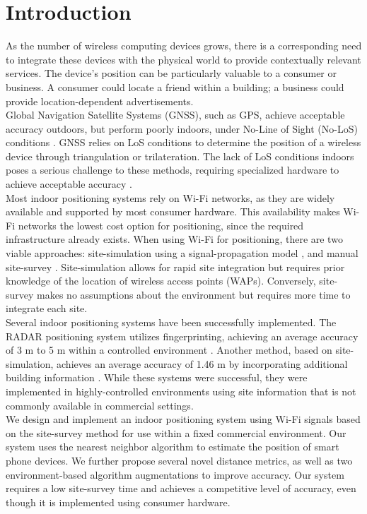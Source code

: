\documentclass[conference]{IEEEtran}
\begin{document}
\section{Introduction}
As the number of wireless computing devices grows, there is a corresponding need to integrate these devices with the physical world to provide contextually relevant services. The device's position can be particularly valuable to a consumer or business. A consumer could locate a friend within a building; a business could provide location-dependent advertisements.\\
\indent Global Navigation Satellite Systems (GNSS), such as GPS, achieve acceptable accuracy outdoors, but perform poorly indoors, under No-Line of Sight (No-LoS) conditions  \cite{Lakmali}. GNSS relies on LoS conditions to determine the position of a wireless device through triangulation or trilateration. The lack of LoS conditions indoors poses a serious challenge to these methods, requiring specialized hardware to achieve acceptable accuracy \cite{Liu}. \\
\indent Most indoor positioning systems rely on Wi-Fi networks, as they are widely available and supported by most consumer hardware. This availability makes Wi-Fi networks the lowest cost option for positioning, since the required infrastructure already exists. When using Wi-Fi for positioning, there are two viable approaches: site-simulation using a signal-propagation model \cite{Kokkinis}, and manual site-survey \cite{Chaudhuri}. Site-simulation allows for rapid site integration but requires prior knowledge of the location of wireless access points (WAPs). Conversely, site-survey makes no assumptions about the environment but requires more time to integrate each site. \\
\indent Several indoor positioning systems have been successfully implemented. The RADAR positioning system utilizes fingerprinting, achieving an average accuracy of 3 m to 5 m within a controlled environment \cite{Bahl}. Another method, based on site-simulation, achieves an average accuracy of 1.46 m by incorporating additional building information \cite{Kokkinis}. While these systems were successful, they were implemented in highly-controlled environments using site information that is not commonly available in commercial settings.\\
\indent We design and implement an indoor positioning system using Wi-Fi signals based on the site-survey method for use within a fixed commercial environment. Our system uses the nearest neighbor algorithm to estimate the position of smart phone devices. We further propose several novel distance metrics, as well as two environment-based algorithm augmentations to improve accuracy. Our system requires a low site-survey time and achieves a competitive level of accuracy, even though it is implemented using consumer hardware.\\
\end{document}
